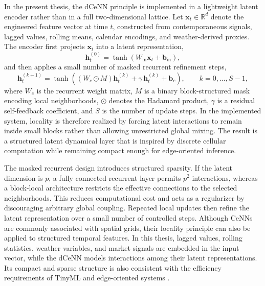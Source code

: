 In the present thesis, the dCeNN principle is implemented in a lightweight latent encoder rather than in a full two-dimensional lattice. Let $\mathbf{x}_t \in \mathbb{R}^{d}$ denote the engineered feature vector at time $t$, constructed from contemporaneous signals, lagged values, rolling means, calendar encodings, and weather-derived proxies. The encoder first projects $\mathbf{x}_t$ into a latent representation,
\begin{equation}
\mathbf{h}_t^{(0)} = \tanh\!\left(W_{\mathrm{in}}\mathbf{x}_t + \mathbf{b}_{\mathrm{in}}\right),
\label{eq:dcenn_proj}
\end{equation}
and then applies a small number of masked recurrent refinement steps,
\begin{equation}
\mathbf{h}_t^{(k+1)} = \tanh\!\left(\left(W_c \odot M\right)\mathbf{h}_t^{(k)} + \gamma\,\mathbf{h}_t^{(k)} + \mathbf{b}_c\right), \qquad k=0,\dots,S-1,
\label{eq:dcenn_masked_update}
\end{equation}
where $W_c$ is the recurrent weight matrix, $M$ is a binary block-structured mask encoding local neighborhoods, $\odot$ denotes the Hadamard product, $\gamma$ is a residual self-feedback coefficient, and $S$ is the number of update steps. In the implemented system, locality is therefore realized by forcing latent interactions to remain inside small blocks rather than allowing unrestricted global mixing. The result is a structured latent dynamical layer that is inspired by discrete cellular computation while remaining compact enough for edge-oriented inference.

The masked recurrent design introduces structured sparsity. If the latent dimension is $p$, a fully connected recurrent layer permits $p^2$ interactions, whereas a block-local architecture restricts the effective connections to the selected neighborhoods. This reduces computational cost and acts as a regularizer by discouraging arbitrary global coupling. Repeated local updates then refine the latent representation over a small number of controlled steps. Although CeNNs are commonly associated with spatial grids, their locality principle can also be applied to structured temporal features. In this thesis, lagged values, rolling statistics, weather variables, and market signals are embedded in the input vector, while the dCeNN models interactions among their latent representations. Its compact and sparse structure is also consistent with the efficiency requirements of TinyML and edge-oriented systems \cite{antonini2023tinyml}.

